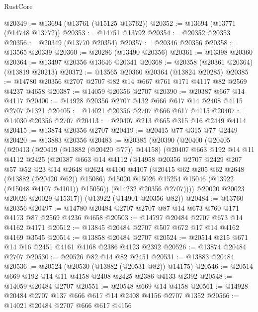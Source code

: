 \begin{lexlean}{RustCore}
\begin{coremodule}
@20349 := @13694 (@13761 (@15125 @13762))
@20352 := @13694 (@13771 (@14748 @13772))
@20353 := @14751 @13792
@20354 := @20352 @20353
@20356 := @20349 (@13770 @20354)
@20357 := @20346 @20356
@20358 := @13565 @20339
@20360 := @20286 (@13490 @20356)
@20361 := @13398 @20360
@20364 := @13497 @20356 @13646 @20341
@20368 := @20358 (@20361 @20364) (@13819 @20213)
@20372 := @13565 @20360 @20364 (@13824 @20285)
@20385 := @14780 @20356 @2707 @2707 @82 @14 @667 @761 @171 @4117 @82 @2569 @4237 @4658
@20387 := @14059 @20356 @2707
@20390 := @20387 @667 @14 @4117
@20400 := @14928 @20356 @2707 @132 @666 @617 @14 @2408 @4115 @2707 @1321
@20405 := @14021 @20356 @2707 @666 @617 @4115
@20407 := @14030 @20356 @2707
@20413 := @20407 @213 @665 @315 @16 @2449 @4114
@20415 := @13874 @20356 @2707
@20419 := @20415 @77 @315 @77 @2449
@20420 := @13883 @20356
@20483 := @20385
    (@20390
      (@20400
        (@20405
          (@20413
            (@20419 (@13882 (@20420 @77)) @14158)
            (@20407
              @663
              @192
              @14
              @11
              @4112
              @2425
              (@20387
                @663
                @14
                @4112
                (@14958
                  @20356
                  @2707
                  @2429
                  @207
                  @57
                  @52
                  @23
                  @14
                  @2648
                  @2624
                  @4100
                  @4107
                  (@20415 @62 @205 @62 @2648 (@13882 (@20420 @62)) @15086)
                  @15020
                  @15026
                  @15254
                  @15046
                  (@13922 (@15048 @4107 @4101))
                  @15056))
              (@14232 @20356 @2707))))
        @20020
        @20023
        @20026
        @20029
        @15317))
    (@13922 (@14901 @20356 @82))
@20484 := @13760 @20356
@20497 := @14780 @20484 @2707 @2707 @87 @14 @673 @760 @171 @4173 @87 @2569 @4236 @4658
@20503 := @14797 @20484 @2707 @673 @14 @4162 @4171
@20512 := @13845 @20484 @2707 @507 @672 @17 @14 @4162 @4169 @3545
@20514 := @13858 @20484 @2707
@20524 := @20514 @215 @671 @14 @16 @2451 @4161 @4168 @2386 @4123 @2392
@20526 := @13874 @20484 @2707
@20530 := @20526 @82 @14 @82 @2451
@20531 := @13883 @20484
@20536 := @20524 (@20530 (@13882 (@20531 @82)) @14175)
@20546 := @20514 @669 @192 @14 @11 @4158 @2408 @2425 @2386 @4133 @2392
@20548 := @14059 @20484 @2707
@20551 := @20548 @669 @14 @4158
@20561 := @14928 @20484 @2707 @137 @666 @617 @14 @2408 @4156 @2707 @1352
@20566 := @14021 @20484 @2707 @666 @617 @4156

\end{coremodule}
\end{lexlean}
